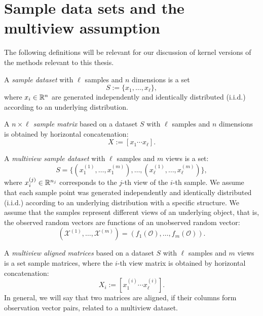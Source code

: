 \section{Sample data sets and the multiview assumption}
The following definitions will be relevant for our discussion of kernel versions of the methods relevant to this thesis.

\begin{definition}\label{def:notation:sample_dataset}
A \emph{sample dataset} with $\ell$ samples and $n$ dimensions is a set
$$ S := \lbrace x_1, \ldots, x_\ell \rbrace, $$
 where $x_i \in \mathbb{R}^n$ are  generated independently and identically distributed (i.i.d.) according to
an underlying distribution. 
\end{definition}

\begin{definition}\label{def:notation:sample_matrix}
A \emph{$n\times\ell$ sample matrix} based on a dataset $S$ with $\ell$ samples and $n$ dimensions is obtained by horizontal concatenation:
$$ X := \left[ x_1 \cdots x_\ell \right]. $$ 
\end{definition}

\begin{definition}\label{def:notation:multiview_dataset}
A \emph{multiview sample dataset} with $\ell$ samples and $m$ views is a set:
$$ S = \big\{ \left( x_1^{(1)},\ldots, x_1^{(m)} \right), \ldots, \left( x_\ell^{(1)}, \ldots, x_\ell^{(m)} \right) \big\}, $$
 where $x_i^{(j)} \in \mathbb{R}^{n_j}$ corresponds to the $j$-th view of the $i$-th sample. We assume that each sample point was generated independently and identically distributed (i.i.d.)
  according to an underlying distribution with a specific structure.
   We assume that the samples represent different views of an underlying object, that is, the observed random vectors
  are functions of an unobserved random vector:
$$ \left( \mathcal{X}^{(1)}, \ldots, \mathcal{X}^{(m)} \right) = \left( f_1(\mathcal{O}), \ldots, f_m(\mathcal{O}) \right).$$  
\end{definition}

\begin{definition}\label{def:notation:multiview_aligned_matrices}
A \emph{multiview aligned matrices} based on a dataset $S$ with $\ell$ samples and $m$ views is a set sample matrices, where the $i$-th view
matrix is obtained by horizontal concatenation:
$$ X_i := \left[ x_1^{(i)} \cdots x_\ell^{(i)} \right]. $$
In general, we will say that two matrices are aligned, if their columns form observation vector pairs, related to a multiview dataset.
\end{definition}

